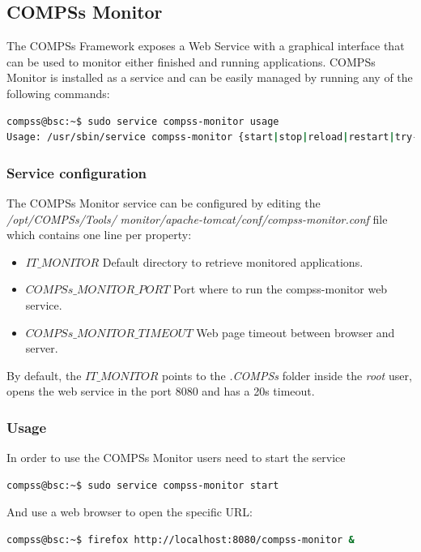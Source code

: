 \subsection{COMPSs Monitor}
\label{subsec:monitor}
The COMPSs Framework exposes a Web Service with a graphical interface that can be used to monitor either finished 
and running applications. COMPSs Monitor is installed as a service and can be easily managed by running any of the following
commands:
\begin{lstlisting}[language=bash]
compss@bsc:~$ sudo service compss-monitor usage
Usage: /usr/sbin/service compss-monitor {start|stop|reload|restart|try-restart|force-reload|status}
\end{lstlisting}

\subsubsection{Service configuration}
The COMPSs Monitor service can be configured by editing the \textit{/opt/COMPSs/Tools/}
\textit{monitor/apache-tomcat/conf/compss-monitor.conf}
file which contains one line per property:
\begin{itemize}
 \item \textbf{$IT\_MONITOR$} Default directory to retrieve monitored applications.
 \item \textbf{$COMPSs\_MONITOR\_PORT$} Port where to run the compss-monitor web service.
 \item \textbf{$COMPSs\_MONITOR\_TIMEOUT$} Web page timeout between browser and server.
\end{itemize}

By default, the $IT\_MONITOR$ points to the \textit{.COMPSs} folder inside the \textit{root} user, opens the web service in the 
port 8080 and has a 20s timeout. 

\subsubsection{Usage}
In order to use the COMPSs Monitor users need to start the service 
\begin{lstlisting}[language=bash]
compss@bsc:~$ sudo service compss-monitor start
\end{lstlisting}
And use a web browser to open the specific URL:
\begin{lstlisting}[language=bash]
compss@bsc:~$ firefox http://localhost:8080/compss-monitor &
\end{lstlisting}

